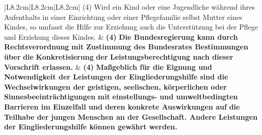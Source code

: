 \documentclass[10pt,a4paper,landscape]{article}
\begin{document}
\begin{longtable}{|L{8.2cm}|L{8.2cm}|L{8.2cm}|}
(4) \textcolor{diffred}{Wird ein Kind} oder \textcolor{diffred}{eine Jugendliche  \newline während ihres Aufenthalts in einer  \newline Einrichtung oder einer Pflegefamilie selbst  \newline Mutter eines Kindes, so umfasst} die \textcolor{diffred}{Hilfe  \newline zur Erziehung auch die Unterstützung bei}  \newline der \textcolor{diffred}{Pflege und Erziehung dieses Kindes.} & \textbf{(4) }\textbf{\textcolor{diffred}{Die Bundesregierung kann durch  \newline Rechtsverordnung}}\textbf{ mit }\textbf{\textcolor{diffred}{Zustimmung des  \newline Bundesrates Bestimmungen über}}\textbf{ die} \newline \textbf{\textcolor{diffred}{Konkretisierung}}\textbf{ der} \newline \textbf{\textcolor{diffred}{Leistungsberechtigung nach dieser  \newline Vorschrift erlassen.}} & \textbf{(4) }\textbf{\textcolor{diffgreen}{Maßgeblich für die Eignung und  \newline Notwendigkeit der Leistungen der  \newline Eingliederungshilfe sind die  \newline Wechselwirkungen der geistigen,  \newline seelischen, körperlichen oder  \newline Sinnesbeeinträchtigungen}}\textbf{ mit} \newline \textbf{\textcolor{diffgreen}{einstellungs- und umweltbedingten  \newline Barrieren im Einzelfall und deren  \newline konkrete Auswirkungen auf}}\textbf{ die }\textbf{\textcolor{diffgreen}{Teilhabe}}\textbf{  \newline der }\textbf{\textcolor{diffgreen}{jungen Menschen an der  \newline Gesellschaft. Andere Leistungen der  \newline Eingliederungshilfe können gewährt  \newline werden.}} \\
\hhline{|---|}

\end{longtable}
\end{document}
